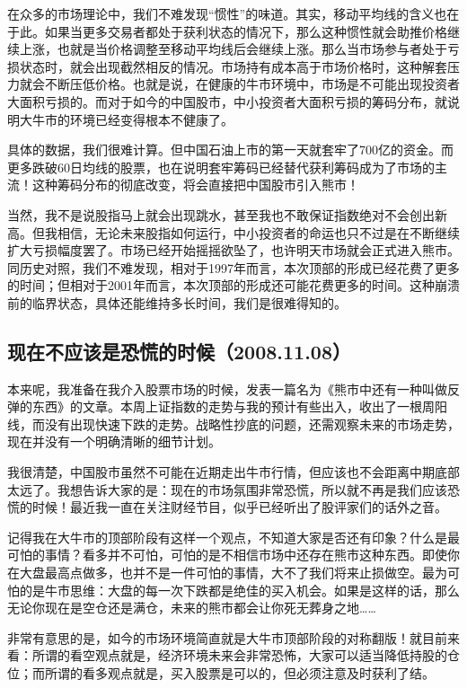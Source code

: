 在众多的市场理论中，我们不难发现“惯性”的味道。其实，移动平均线的含义也在于此。如果当更多交易者都处于获利状态的情况下，那么这种惯性就会助推价格继续上涨，也就是当价格调整至移动平均线后会继续上涨。那么当市场参与者处于亏损状态时，就会出现截然相反的情况。市场持有成本高于市场价格时，这种解套压力就会不断压低价格。也就是说，在健康的牛市环境中，市场是不可能出现投资者大面积亏损的。而对于如今的中国股市，中小投资者大面积亏损的筹码分布，就说明大牛市的环境已经变得根本不健康了。

具体的数据，我们很难计算。但中国石油上市的第一天就套牢了700亿的资金。而更多跌破60日均线的股票，也在说明套牢筹码已经替代获利筹码成为了市场的主流！这种筹码分布的彻底改变，将会直接把中国股市引入熊市！

当然，我不是说股指马上就会出现跳水，甚至我也不敢保证指数绝对不会创出新高。但我相信，无论未来股指如何运行，中小投资者的命运也只不过是在不断继续扩大亏损幅度罢了。市场已经开始摇摇欲坠了，也许明天市场就会正式进入熊市。同历史对照，我们不难发现，相对于1997年而言，本次顶部的形成已经花费了更多的时间；但相对于2001年而言，本次顶部的形成还可能花费更多的时间。这种崩溃前的临界状态，具体还能维持多长时间，我们是很难得知的。

\subsection{现在不应该是恐慌的时候（2008.11.08）}

本来呢，我准备在我介入股票市场的时候，发表一篇名为《熊市中还有一种叫做反弹的东西》的文章。本周上证指数的走势与我的预计有些出入，收出了一根周阳线，而没有出现快速下跌的走势。战略性抄底的问题，还需观察未来的市场走势，现在并没有一个明确清晰的细节计划。

我很清楚，中国股市虽然不可能在近期走出牛市行情，但应该也不会距离中期底部太远了。我想告诉大家的是：现在的市场氛围非常恐慌，所以就不再是我们应该恐慌的时候！最近我一直在关注财经节目，似乎已经听出了股评家们的话外之音。

记得我在大牛市的顶部阶段有这样一个观点，不知道大家是否还有印象？什么是最可怕的事情？看多并不可怕，可怕的是不相信市场中还存在熊市这种东西。即使你在大盘最高点做多，也并不是一件可怕的事情，大不了我们将来止损做空。最为可怕的是牛市思维：大盘的每一次下跌都是绝佳的买入机会。如果是这样的话，那么无论你现在是空仓还是满仓，未来的熊市都会让你死无葬身之地……

非常有意思的是，如今的市场环境简直就是大牛市顶部阶段的对称翻版！就目前来看：所谓的看空观点就是，经济环境未来会非常恐怖，大家可以适当降低持股的仓位；而所谓的看多观点就是，买入股票是可以的，但必须注意及时获利了结。

